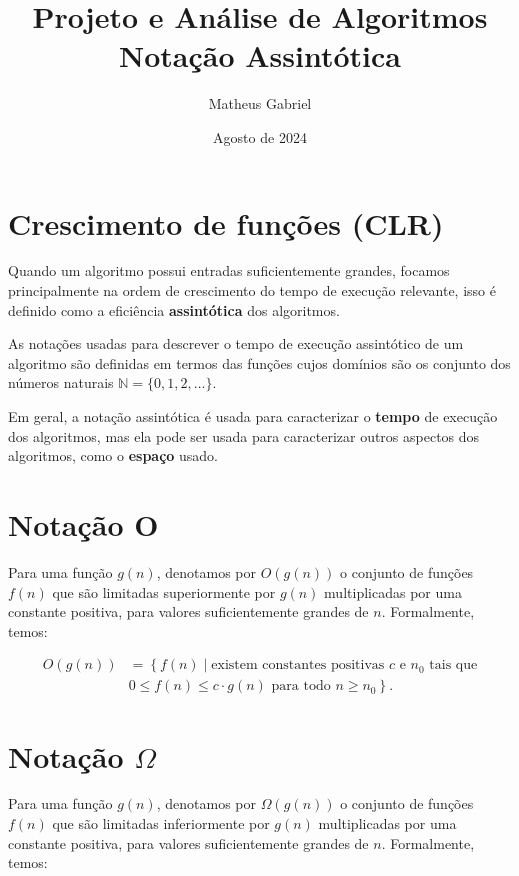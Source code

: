 \documentclass{article}
\title{Projeto e Análise de Algoritmos \\
    Notação Assintótica}
\author{Matheus Gabriel}
\date{Agosto de 2024}
\begin{document}
\maketitle

\section{Crescimento de funções (CLR)}

Quando um algoritmo possui entradas suficientemente grandes, focamos principalmente na ordem de crescimento do tempo de execução relevante, isso é definido como a eficiência \textbf{assintótica} dos algoritmos.

As notações usadas para descrever o tempo de execução assintótico de um algoritmo são definidas em termos das funções cujos domínios são os conjunto dos números naturais $\mathbb{N} = \{0,1,2,\dots\}$.

Em geral, a notação assintótica é usada para caracterizar o \textbf{tempo} de execução dos algoritmos, mas ela pode ser usada para caracterizar outros aspectos dos algoritmos, como o \textbf{espaço} usado.

\section{Notação O}

Para uma função \( g(n) \), denotamos por \( O(g(n)) \) o conjunto de funções \( f(n) \) que são limitadas superiormente por \( g(n) \) multiplicadas por uma constante positiva, para valores suficientemente grandes de \( n \). Formalmente, temos:

\begin{align*}
O(g(n)) &= \left\{ f(n) \mid \text{existem constantes positivas } c \text{ e } n_0 \text{ tais que} \right. \\
&\left. 0 \leq f(n) \leq c \cdot g(n) \text{ para todo } n \geq n_0 \right\}.
\end{align*}

\section{Notação \(\Omega\)}

Para uma função \( g(n) \), denotamos por \( \Omega(g(n)) \) o conjunto de funções \( f(n) \) que são limitadas inferiormente por \( g(n) \) multiplicadas por uma constante positiva, para valores suficientemente grandes de \( n \). Formalmente, temos:
\end{document}
